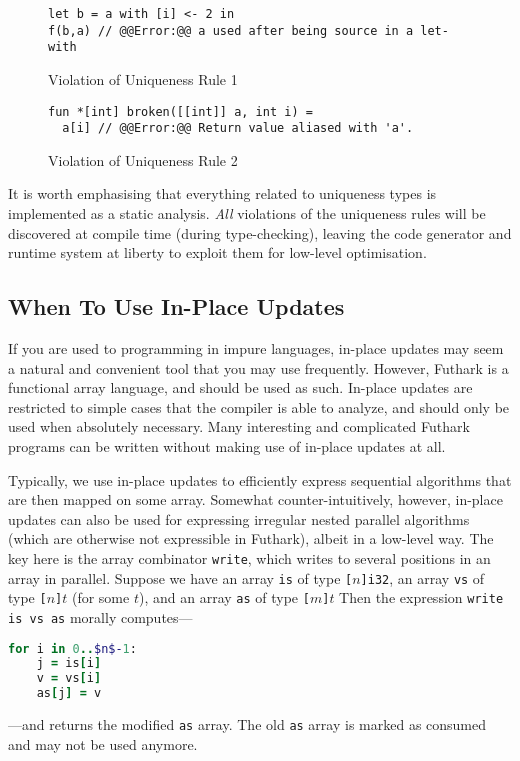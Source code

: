 \documentclass[oneside,11pt]{book}
\begin{document}
\begin{figure}
\centering
\begin{lstlisting}
let b = a with [i] <- 2 in
f(b,a) // @@Error:@@ a used after being source in a let-with
\end{lstlisting}
\caption{Violation of Uniqueness Rule 1}
\label{fig:uniqueness-rule-1-violation}
\end{figure}

\begin{figure}
\centering
\begin{lstlisting}
fun *[int] broken([[int]] a, int i) =
  a[i] // @@Error:@@ Return value aliased with 'a'.
\end{lstlisting}
\caption{Violation of Uniqueness Rule 2}
\label{fig:uniqueness-rule-2-violation}
\end{figure}

It is worth emphasising that everything related to uniqueness types is
implemented as a static analysis.  \textit{All} violations of the
uniqueness rules will be discovered at compile time (during
type-checking), leaving the code generator and runtime system at
liberty to exploit them for low-level optimisation.

\subsection{When To Use In-Place Updates}

If you are used to programming in impure languages, in-place updates
may seem a natural and convenient tool that you may use frequently.
However, Futhark is a functional array language, and should be used as
such.  In-place updates are restricted to simple cases that the
compiler is able to analyze, and should only be used when absolutely
necessary.  Many interesting and complicated Futhark programs can be
written without making use of in-place updates at all.

Typically, we use in-place updates to efficiently express sequential
algorithms that are then mapped on some array.  Somewhat
counter-intuitively, however, in-place updates can also be used for
expressing irregular nested parallel algorithms (which are otherwise
not expressible in Futhark), albeit in a low-level way.  The key here
is the array combinator \texttt{write}, which writes to several
positions in an array in parallel.  Suppose we have an array
\texttt{is} of type \texttt{[$n$]i32}, an array \texttt{vs} of type
\texttt{[$n$]$t$} (for some \texttt{$t$}), and an array \texttt{as}
of type \texttt{[$m$]$t$} Then the expression \texttt{write is vs
  as} morally computes---
\begin{lstlisting}[language=ruby,mathescape=true]
  for i in 0..$n$-1:
    j = is[i]
    v = vs[i]
    as[j] = v
\end{lstlisting}
---and returns the modified \texttt{as} array.  The old \texttt{as}
array is marked as consumed and may not be used anymore.
\end{document}
